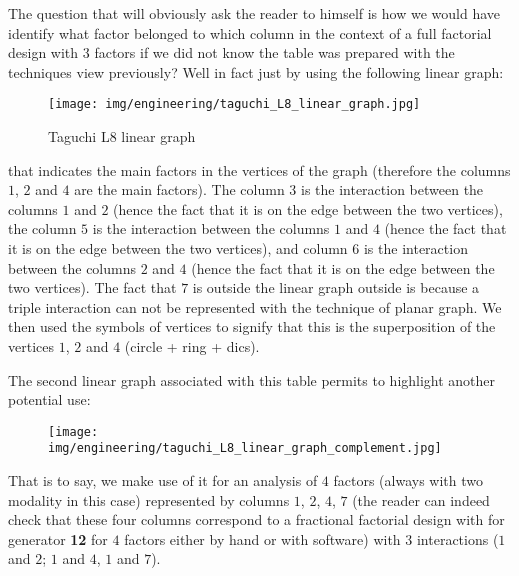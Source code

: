 	The question that will obviously ask the reader to himself is how we would have identify what factor belonged to which column in the context of a full factorial design with $3$ factors if we did not know the table was prepared with the techniques view previously? Well in fact just by using the following linear graph:
	\begin{figure}[H]
		\begin{center}
		\texttt{[image: img/engineering/taguchi\_L8\_linear\_graph.jpg]}
		\caption{Taguchi L8 linear graph}
		\end{center}	
	\end{figure}
	that indicates the main factors in the vertices of the graph (therefore the columns $1$, $2$ and $4$ are the main factors). The column $3$ is the interaction between the columns $1$ and $2$ (hence the fact that it is on the edge between the two vertices), the column $5$ is the interaction between the columns $1$ and $4$ (hence the fact that it is on the edge between the two vertices), and column $6$ is the interaction between the columns $2$ and $4$ (hence the fact that it is on the edge between the two vertices). The fact that $7$ is outside the linear graph outside is because a triple interaction can not be represented with the technique of planar graph. We then used the symbols of vertices to signify that this is the superposition of the vertices $1$, $2$ and $4$ (circle + ring + dics).

	The second linear graph associated with this table permits to highlight another potential use:
	\begin{figure}[H]
		\begin{center}
		\texttt{[image: img/engineering/taguchi\_L8\_linear\_graph\_complement.jpg]}
		\end{center}	
	\end{figure}
	That is to say, we make use of it for an analysis of $4$ factors (always with two modality in this case) represented by columns $1$, $2$, $4$, $7$ (the reader can indeed check that these four columns correspond to a fractional factorial design with for generator \textbf{12} for $4$ factors either by hand or with software) with $3$ interactions ($1$ and $2$; $1$ and $4$, $1$ and $7$).
	
